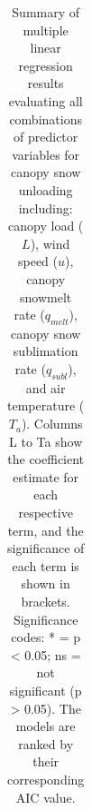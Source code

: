 \documentclass[
  letterpaper,
  DIV=11,
  numbers=noendperiod]{scrartcl}
\begin{document}
\begin{longtable}[]{@{}
  >{\raggedright\arraybackslash}p{}
  >{\raggedright\arraybackslash}p{}
  >{\raggedright\arraybackslash}p{}
  >{\raggedright\arraybackslash}p{}
  >{\raggedright\arraybackslash}p{}
  >{\raggedright\arraybackslash}p{}
  >{\raggedright\arraybackslash}p{}
  >{\raggedright\arraybackslash}p{}
  >{\raggedleft\arraybackslash}p{}
  >{\raggedleft\arraybackslash}p{}@{}}

\caption{\label{tbl-q-unld-bins}Summary of multiple linear regression
results evaluating all combinations of predictor variables for canopy
snow unloading including: canopy load (\(L\)), wind speed (\(u\)),
canopy snowmelt rate (\(q_{melt}\)), canopy snow sublimation rate
(\(q_{subl}\)), and air temperature (\(T_a\)). Columns L to Ta show the
coefficient estimate for each respective term, and the significance of
each term is shown in brackets. Significance codes: * = p \textless{}
0.05; ns = not significant (p \textgreater{} 0.05). The models are
ranked by their corresponding AIC value.}

\tabularnewline


\end{longtable}
\end{document}

